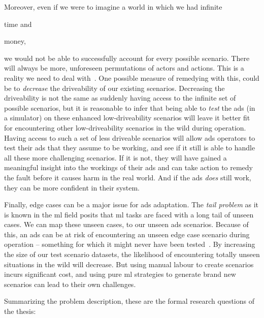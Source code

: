 Moreover, even if we were to imagine a world in which we had infinite \begin{inparaenum}
    \item time and
    \item money, \end{inparaenum} we would not be able to successfully account for every possible
scenario.
There will always be more, unforeseen permutations of actors and actions. This is a reality
we need to deal with~\cite[1]{leahy2024grandchallenge}.
One possible measure of remedying with this, could be to \textit{decrease} the
driveability of our existing scenarios. Decreasing the driveability is not the same as suddenly
having access to the infinite set of possible scenarios, but it is reasonable to infer that being
able to \textit{test} the \acrshort{ads} (in a simulator) on these enhanced low-driveability
scenarios will leave it better fit for encountering other low-driveability scenarios in the wild
during operation. Having access to such a set of less driveable scenarios will allow \acrshort{ads}
operators to test their \acrshort{ads} that they assume to be working, and see if it still is able
to handle all these more challenging scenarios. If it is not, they will have gained a meaningful
insight into the workings of their \acrshort{ads} and can take action to remedy the fault before it
causes harm in the real world. And if the \acrshort{ads} \emph{does} still work, they can be more
confident in their system.

Finally, edge cases can be a major issue for \acrshort{ads} adaptation. The \emph{tail problem} as
it is known in the \acrfull{ml} field posits that \acrshort{ml} tasks are faced with a long tail of
unseen cases. We can map these unseen cases, to our unseen \acrshort{ads} scenarios. Because of
this, an \acrshort{ads} can be at risk of encountering an unseen edge case scenario during operation
-- something for which it might never have been tested~\cite[1]{yao2025agentsllm}.
By increasing the size of our test scenario datasets, the likelihood of encountering totally unseen
situations in the wild will decrease. But using manual labour to create scenarios incurs significant
cost, and using pure \acrshort{ml} strategies to generate brand new scenarios can lead to their own
challenges.

Summarizing the problem description, these are the formal research
questions of the thesis:

\newcommand{\rqdecreasedriveability}{Can \acrlongpl{llm} be used to decrease the driveability of \acrlong{ads} simulator scenarios?}
\newcommand{\rqnohuman}{Is it feasible to employ \acrshortpl{llm} for obtaining unseen scenarios for \acrshort{ads} testing without human intervention?}

